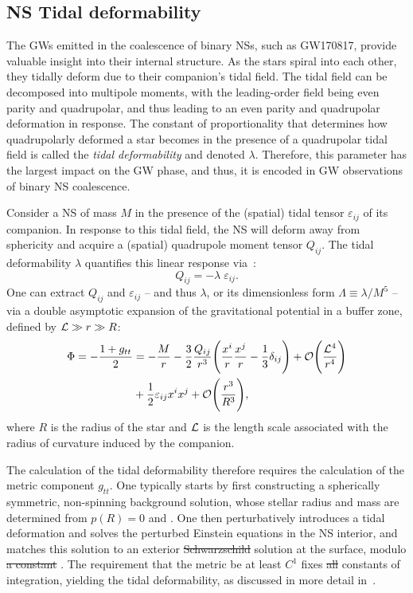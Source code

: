 \documentclass[prd,twocolumn,nofootinbib,superscriptaddress,amsmath,amssymb]{revtex4-1}
\begin{document}
\subsection{NS Tidal deformability}\label{tidal}

The GWs emitted in the coalescence of binary NSs, such as GW170817, provide valuable insight into their internal structure. As the stars spiral into each other, they tidally deform due to their companion's tidal field. The tidal field can be decomposed into multipole moments, with the leading-order field being even parity and quadrupolar, and thus leading to an even parity and quadrupolar deformation in response. The constant of proportionality that determines how quadrupolarly deformed a star becomes in the presence of a quadrupolar tidal field is called the \emph{tidal deformability} and denoted $\lambda$. Therefore, this parameter has the largest impact on the GW phase, and thus, it is encoded in GW observations of binary NS coalescence.  

Consider a NS of mass $M$ in the presence of the (spatial) tidal tensor $\varepsilon_{ij}$ of its companion. In response to this tidal field, the NS will deform away from sphericity and acquire a (spatial) quadrupole moment tensor $Q_{ij}$. The tidal deformability $\lambda$ quantifies this linear response via~\cite{Flanagan2008,hinderer-love,Yagi:ILQ}:
\begin{equation}
Q_{ij}=-\lambda \; \varepsilon_{ij}.
\end{equation}
One can extract $Q_{ij}$ and $\varepsilon_{ij}$ -- and thus $\lambda$, or its dimensionless form $\Lambda \equiv \lambda/M^5$ -- via a double asymptotic expansion of the gravitational potential in a buffer zone, defined by ${\cal{L}} \gg r \gg R$: 
\begin{align}
\Phi=- \frac{1+g_{tt}}{2}&=-\frac{M}{r} - \frac{3}{2}\frac{Q_{ij}}{r^3} \Bigg(\frac{x^i}{r} \frac{x^j}{r}-\frac{1}{3}\delta_{ij} \Bigg) + \mathcal{O} \Bigg( \frac{{\cal{L}}^4}{r^4} \Bigg)
\nonumber \\ &+ \frac{1}{2} \varepsilon_{ij} x^i x^j + \mathcal{O} \Bigg( \frac{r^3}{R^3} \Bigg),
\end{align}
where $R$ is the radius of the star and ${\cal{L}}$ is the length scale associated with the radius of curvature induced by the companion. 

The calculation of the tidal deformability therefore requires the calculation of the metric component $g_{tt}$. One typically starts by first constructing a spherically symmetric, non-spinning background solution, whose stellar radius and mass are determined from $p(R)=0$ and . One then perturbatively introduces a tidal deformation and solves the perturbed Einstein equations in the NS interior, and matches this solution to an exterior \sout{Schwarzschild}  solution at the surface, modulo \sout{a constant} . The requirement that the metric be at least $C^{1}$ fixes \sout{all}  constants of integration, yielding the tidal deformability, as discussed in more detail in~\cite{hinderer-love}. 
\end{document}
